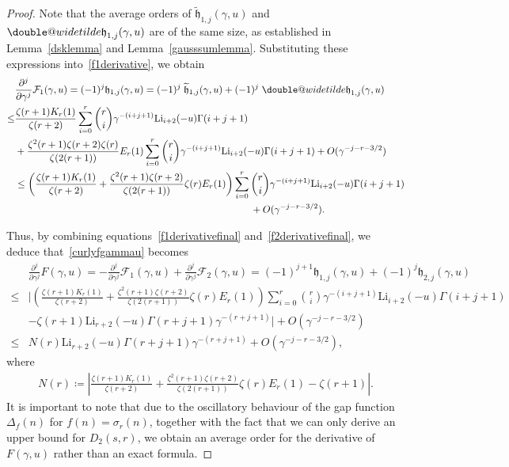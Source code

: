 \documentclass[12pt, oneside,reqno]{amsart}
\makeatletter
\numberwithin{equation}{section}
\newcommand{\doublewidetilde}[1]{{%
  \mathpalette\double@widetilde{#1}%
}}
\newcommand{\double@widetilde}[2]{%
  \sbox\z@{$\m@th#1\widetilde{#2}$}%
  \ht\z@=.9\ht\z@
  \widetilde{\box\z@}%
}
\makeatother
\begin{document}
\begin{proof}
\noindent
Note that the average orders of $\widetilde{\mathfrak{h}}_{1,j}(\gamma,u)$ and $\doublewidetilde{\mathfrak{h}}_{1,j}(\gamma,u)$ are of the same size, as established in Lemma~\ref{dsklemma} and Lemma~\ref{gausssumlemma}. Substituting these expressions into~\eqref{f1derivative}, we obtain
\begin{align}\label{f1derivativefinal}
&\frac{\partial^j}{\partial\gamma^j}\mathcal{F}_1(\gamma,u)
=(-1)^{j}\mathfrak{h}_{1,j}(\gamma,u)
=(-1)^{j}\;\widetilde{\mathfrak{h}}_{1,j}(\gamma,u)+(-1)^{j}\;\doublewidetilde{\mathfrak{h}}_{1,j}(\gamma,u)\nonumber\\
\leq&\frac{\zeta(r+1)K_r(1)}{\zeta(r+2)}\sum_{i=0}^{r}\binom{r}{i}\gamma^{-(i+j+1)}\mathrm{Li}_{i+2}(-u)\Gamma(i+j+1)\nonumber\\
&+\frac{\zeta^2(r+1)\zeta(r+2)\zeta(r)}{\zeta(2(r+1))}E_r(1)\sum_{i=0}^{r}\binom{r}{i}\gamma^{-(i+j+1)}\mathrm{Li}_{i+2}(-u)\Gamma(i+j+1)+O(\gamma^{-j-r-3/2})\nonumber\\
&\leq\left(\frac{\zeta(r+1)K_r(1)}{\zeta(r+2)}+\frac{\zeta^2(r+1)\zeta(r+2)}{\zeta(2(r+1))}\zeta(r)E_r(1)\right)\sum_{i=0}^{r}\binom{r}{i}\gamma^{-(i+j+1)}\mathrm{Li}_{i+2}(-u)\Gamma(i+j+1)\nonumber\\
&\quad\quad\quad\quad\quad\quad\quad\quad\quad\quad\quad\quad\quad\quad\quad\quad\quad\quad\quad\quad\quad\quad\quad\quad+O(\gamma^{-j-r-3/2}).
\end{align}

\noindent
Thus, by combining equations~\eqref{f1derivativefinal} and~\eqref{f2derivativefinal}, we deduce that~\eqref{curlyfgammau} becomes
\begin{align}\label{fgammauderivativefinal}
&\frac{\partial^j}{\partial\gamma^j}F(\gamma,u)
=-\frac{\partial^j}{\partial\gamma^j}\mathcal{F}_1(\gamma,u)
+\frac{\partial^j}{\partial\gamma^j}\mathcal{F}_2(\gamma,u)
=(-1)^{j+1}\mathfrak{h}_{1,j}(\gamma,u)+(-1)^{j}\mathfrak{h}_{2,j}(\gamma,u)\nonumber\\
\leq &\bigg|\left(\frac{\zeta(r+1)K_r(1)}{\zeta(r+2)}+\frac{\zeta^2(r+1)\zeta(r+2)}{\zeta(2(r+1))}\zeta(r)E_r(1)\right)\sum_{i=0}^{r}\binom{r}{i}\gamma^{-(i+j+1)}\mathrm{Li}_{i+2}(-u)\Gamma(i+j+1)\nonumber\\
&-\zeta(r+1)\mathrm{Li}_{r+2}(-u)\Gamma(r+j+1)\gamma^{-(r+j+1)}\bigg|+O(\gamma^{-j-r-3/2})\nonumber\\
\leq& N(r)\mathrm{Li}_{r+2}(-u)\Gamma(r+j+1)\gamma^{-(r+j+1)}+O(\gamma^{-j-r-3/2}),
\end{align}
where
\begin{align}\label{nrdefinition}
N(r)
\coloneqq\left|\frac{\zeta(r+1)K_r(1)}{\zeta(r+2)}+\frac{\zeta^2(r+1)\zeta(r+2)}{\zeta(2(r+1))}\zeta(r)E_r(1)-\zeta(r+1)\right|.  
\end{align}
\noindent
It is important to note that due to the oscillatory behaviour of the gap function $\Delta_f(n)$ for $f(n)=\sigma_r(n)$, together with the fact that we can only derive an upper bound for $D_2(s,r)$, we obtain an average order for the derivative of $F(\gamma,u)$ rather than an exact formula.


\end{proof}
\end{document}
